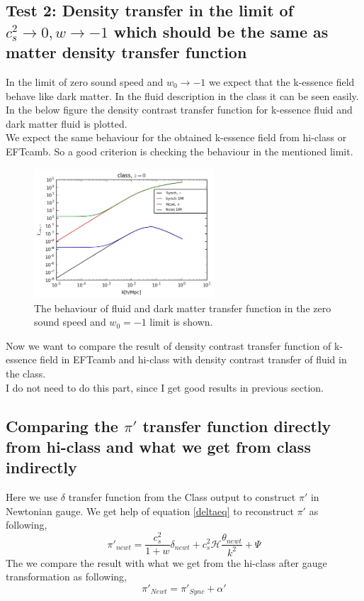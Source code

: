 \documentclass[a4paper,14pt]{article}
\newcommand {\be}{\begin{equation}}
\newcommand {\ee}{\end{equation}}
\begin{document}
\subsection{Test 2: Density transfer in the limit of $c_s^2 \rightarrow 0 , w \rightarrow -1$ which should be the same as matter density transfer function}
In the limit of zero sound speed and $w_0 \rightarrow -1$ we expect that the k-essence field behave like dark matter. In the fluid description in the class it can be seen easily. In the below figure the density contrast transfer function for k-essence fluid and dark matter fluid is plotted. \\
We expect the same behaviour for the obtained k-essence field from hi-class or EFTcamb. So a good criterion is checking the behaviour in the mentioned limit.
\begin{figure}[H]
\begin{center}
\captionsetup{,margin=1cm}
\includegraphics[width=0.60\textwidth]{cs0w1_fld.jpg} 
\caption{The behaviour of fluid and dark matter transfer function in the zero sound speed and $w_0 =-1$ limit is shown.  }
\end{center}
\end{figure}
Now we want to compare the result of density contrast transfer function of k-essence field in EFTcamb and hi-class with density contrast transfer of  fluid in the class. \\
I do not need to do this part, since I get good results in previous section.
\subsection{Comparing the  ${\pi'}$ transfer function directly from hi-class and what we get from class indirectly}
Here we use $\delta$ transfer function from the Class output to construct $\pi'$ in Newtonian gauge. We get help of equation \ref{deltaeq} to reconstruct $\pi'$ as following,
\be
\pi'_{newt}= \frac{c_s^2}{1+w} \delta_{newt} + c_s^2 \mathcal{H} \frac{\theta_{newt}}{k^2} +\Psi
\ee
The we compare the result with what we get from the hi-class after gauge transformation as following,
\be
\pi'_{Newt} =\pi'_{Sync}+\alpha'
\ee
\end{document}
